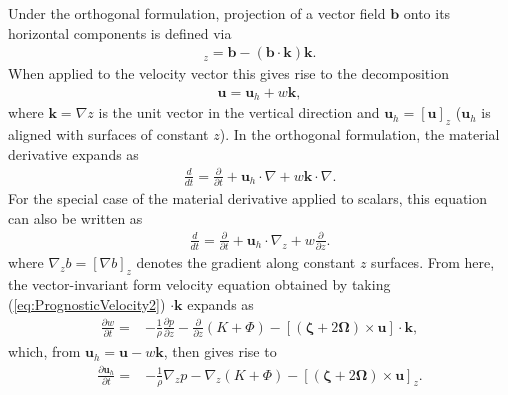 \documentclass[gmd, manuscript]{copernicus}
\newcommand{\vb}{\mathbf}
\newcommand{\vg}{\boldsymbol}
\newcommand{\diff}[2]{\frac{d #1}{d #2}}
\newcommand{\pdiff}[2]{\frac{\partial #1}{\partial #2}}
\begin{document}
Under the orthogonal formulation, projection of a vector field $\vb{b}$ onto its horizontal components is defined via
\begin{align}
[\vb{b}]_z = \vb{b} - (\vb{b} \cdot \vb{k}) \vb{k}.
\end{align}  When applied to the velocity vector this gives rise to the decomposition
\begin{align}
\vb{u} = \vb{u}_h + w \vb{k},
\end{align} where $\vb{k} = \nabla z$ is the unit vector in the vertical direction and $\vb{u}_h = [\vb{u}]_z$ ($\vb{u}_h$ is aligned with surfaces of constant $z$).  In the orthogonal formulation, the material derivative expands as
\begin{align} \label{eq:MaterialDerivative}
\diff{}{t} = \pdiff{}{t} + \vb{u}_h \cdot \nabla + w \vb{k} \cdot \nabla.
\end{align}  For the special case of the material derivative applied to scalars, this equation can also be written as
\begin{align} \label{eq:MaterialDerivativeScalar}
\diff{}{t} = \pdiff{}{t} + \vb{u}_h \cdot \nabla_z + w \pdiff{}{z}.
\end{align} where $\nabla_z b = [\nabla b]_z$ denotes the gradient along constant $z$ surfaces.  From here, the vector-invariant form velocity equation obtained by taking (\ref{eq:PrognosticVelocity2}) $\cdot \vb{k}$ expands as
\begin{align} \label{eq:VerticalVelocityOrthogonal}
\pdiff{w}{t} =& - \frac{1}{\rho} \pdiff{p}{z} - \pdiff{}{z} (K + \Phi) - \left[ (\vg{\zeta} + 2 \vg{\Omega}) \times \vb{u} \right] \cdot \vb{k},
\end{align} which, from $\vb{u}_h = \vb{u} - w \vb{k}$, then gives rise to
\begin{align} \label{eq:HorizontalVelocityOrthogonal}
\pdiff{\vb{u}_h}{t} =& - \frac{1}{\rho} \nabla_z p - \nabla_z (K + \Phi) - \left[ (\vg{\zeta} + 2 \vg{\Omega}) \times \vb{u} \right]_z.\end{align}

\end{document}
